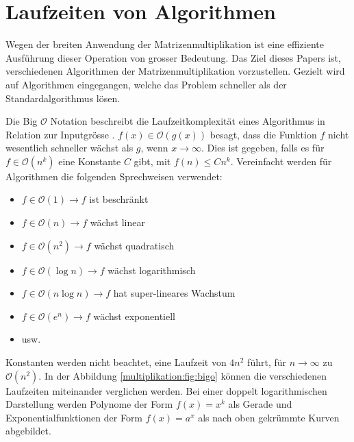 %
%
%
\section{Laufzeiten von Algorithmen}
Wegen der breiten Anwendung der Matrizenmultiplikation ist eine effiziente Ausführung dieser Operation von grosser Bedeutung.
Das Ziel dieses Papers ist, verschiedenen Algorithmen der Matrizenmultiplikation vorzustellen.
Gezielt wird auf Algorithmen eingegangen, welche das Problem schneller als der Standardalgorithmus l\"osen.

\label{muliplikation:sec:bigo}
Die Big $\mathcal{O}$ Notation beschreibt die Laufzeitkomplexit\"at eines Algorithmus in Relation zur Inputgrösse \cite{multiplikation:bigo}.
$f(x) \in \mathcal{O}(g(x))$ besagt, dass die Funktion $f$ nicht wesentlich schneller w\"achst als $g$, wenn $x \rightarrow \infty$.
Dies ist gegeben, falls es für $f \in \mathcal{O}(n^k)$ eine Konstante $C$ gibt, mit $f(n) \leq Cn^k$.
Vereinfacht werden f\"ur Algorithmen die folgenden Sprechweisen verwendet:
\begin{itemize}
	\item $f \in \mathcal{O}(1) \rightarrow f$ ist beschr\"ankt
	\item $f \in \mathcal{O}(n) \rightarrow f$ w\"achst linear
	\item $f \in \mathcal{O}  (n^2   ) \rightarrow f$ w\"achst quadratisch
	\item $f \in \mathcal{O}(\log n) \rightarrow f$ w\"achst logarithmisch
	\item $f \in \mathcal{O}(n \log n) \rightarrow f$ hat super-lineares Wachstum
	\item $f \in \mathcal{O}  (e^n   ) \rightarrow f$ w\"achst exponentiell
	\item usw.
\end{itemize}

Konstanten werden nicht beachtet, eine Laufzeit von  $4n^2$ führt, für $n \rightarrow \infty$ zu $\mathcal{O}(n^2)$.
In der Abbildung \ref{multiplikation:fig:bigo} k\"onnen die verschiedenen Laufzeiten miteinander verglichen werden.
Bei einer doppelt logarithmischen Darstellung werden Polynome der Form $f(x) = x^k$ als Gerade und Exponentialfunktionen der Form $f(x) = a^x$ als nach oben gekr\"ummte Kurven abgebildet.



